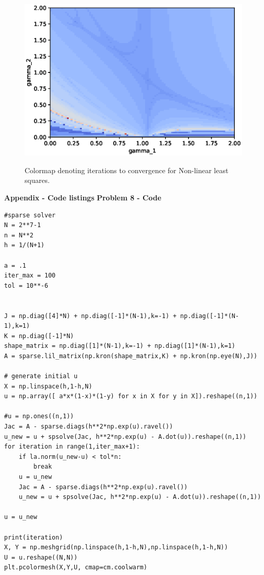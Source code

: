 \documentclass[12pt]{article}
\newcommand{\problem}[1]{\hspace{-4 ex} \large \textbf{Problem #1} }
\begin{document}
\begin{figure}[H]
	\caption{Colormap denoting iterations to convergence for Non-linear least squares.}
	\includegraphics[width=1\textwidth]{hwch9_p15_figure_4}
	\label{p15iter}
	\centering
\end{figure}



\bigbreak





{\hspace{-4 ex} \huge \textbf{Appendix - Code listings}}\bigbreak
\problem{8 - Code}
\begin{lstlisting}
#sparse solver
N = 2**7-1
n = N**2
h = 1/(N+1)

a = .1
iter_max = 100
tol = 10**-6


J = np.diag([4]*N) + np.diag([-1]*(N-1),k=-1) + np.diag([-1]*(N-1),k=1)
K = np.diag([-1]*N)
shape_matrix = np.diag([1]*(N-1),k=-1) + np.diag([1]*(N-1),k=1)
A = sparse.lil_matrix(np.kron(shape_matrix,K) + np.kron(np.eye(N),J))

# generate initial u
X = np.linspace(h,1-h,N)
u = np.array([ a*x*(1-x)*(1-y) for x in X for y in X]).reshape((n,1))

#u = np.ones((n,1))
Jac = A - sparse.diags(h**2*np.exp(u).ravel())
u_new = u + spsolve(Jac, h**2*np.exp(u) - A.dot(u)).reshape((n,1))
for iteration in range(1,iter_max+1):
	if la.norm(u_new-u) < tol*n:
		break
	u = u_new
	Jac = A - sparse.diags(h**2*np.exp(u).ravel())
	u_new = u + spsolve(Jac, h**2*np.exp(u) - A.dot(u)).reshape((n,1))

u = u_new

print(iteration)
X, Y = np.meshgrid(np.linspace(h,1-h,N),np.linspace(h,1-h,N))
U = u.reshape((N,N))
plt.pcolormesh(X,Y,U, cmap=cm.coolwarm)
\end{lstlisting}
\end{document}
